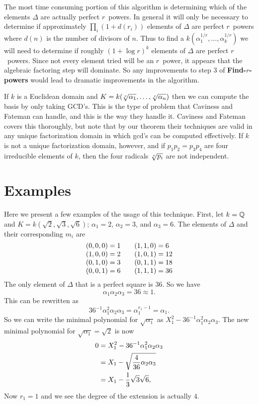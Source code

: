 \medskip
The most time consuming portion of this algorithm is determining
which of the elements $\Delta$ are actually perfect $r$\th\ powers.  
In general it will only be necessary to determine if
approximately $\prod_i(1 + d(r_i))$ elements of $\Delta$ are perfect
$r$\th\ powers where $d(n)$ is the number of divisors of $n$.
Thus to find a $k(\alpha_1^{1/r}, \ldots, \alpha_k^{1/r})$
we will need to determine if roughly $(1 + \log r)^k$ elements of
$\Delta$ are perfect $r$\th\ powers.  Since not every element tried will
be an $r$\th\ power, it appears that the algebraic factoring step will 
dominate.  So any improvements to step 3 of {\bf Find-$r$\th-powers} would
lead to dramatic improvements in the algorithm.  

If $k$ is a Euclidean domain and 
$K = k(\root r \of {\alpha_1}, \ldots, \root r \of {\alpha_n})$
then we can compute the basis by only taking GCD's.
This is the type of problem that Caviness and Fateman can handle, and this
is the way they handle it.  Caviness and Fateman
\cite{Caviness:Fateman} covers this thoroughly, but note that by our
theorem their techniques are valid in any unique factorization domain
in which gcd's can be computed effectively.  If $k$ is not a unique
factorization domain, however, and if $p_1 p_2 = p_3 p_4$ are four
irreducible elements of $k$, then the four radicals $\root r \of
{p_i}$ are not independent. 

\section{Examples}
\label{Kummer:Example:Sec}

Here we present a few examples of the usage of this technique.  First,
let $k = \mathbb{Q}$ and $K = k(\sqrt{2}, \sqrt{3}, \sqrt{6})$; $\alpha_1=2$, 
$\alpha_2=3$, and  $\alpha_3=6$.  The elements of $\Delta$ and their
corresponding $m_i$ are  
\[
\vcenter{\halign{\hfil$(#)$&$\null = #$\hfil\qquad&\hfil$(#)$&$\null =
#$\hfil\cr
0,0,0& 1&1,1,0& 6\cr 
1,0,0& 2&1,0,1& 12\cr
0,1,0& 3&0,1,1& 18\cr
0,0,1& 6&1,1,1&36\cr}}
\]
The only element of $\Delta$ that is a perfect square is $36$.  So we
have
\[
\alpha_1 \alpha_2 \alpha_3 = 36 \approx 1.
\]
This can be rewritten as 
\[
36^{-1} \alpha_1^2 \alpha_2 \alpha_3 = \alpha_1^{r_1 -1} = \alpha_1.
\]
So we can write the minimal polynomial for $\sqrt{\alpha_1}$ as
$X_1^2 - 36^{-1} \alpha_1^2 \alpha_2 \alpha_3$.  
The new minimal polynomial for $\sqrt{\alpha_1}= \sqrt{2}$ is now 
\[
\begin{aligned}
0 &= X_1^2 - 36^{-1} \alpha_1^2 \alpha_2 \alpha_3\\
& = X_1 - \sqrt{{4 \over 36} \alpha_2 \alpha_3}\\
& =X_1 - {1 \over 3} \sqrt{3} \sqrt{6},
\end{aligned}
\]
Now $r_1 = 1$ and we see the degree of the extension is actually $4$.

